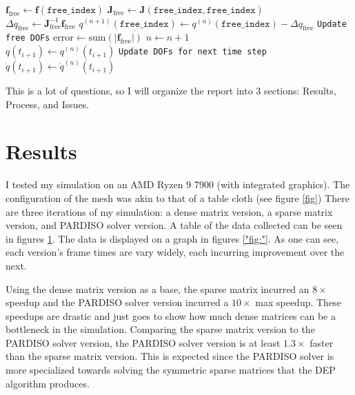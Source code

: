 \documentclass[letterpaper, 10 pt, conference]{ieeeconf}  %
\begin{document}
\begin{algorithm}[h]
\begin{algorithmic}[1]
                        \State $\mathbf{f}_\text{free} \gets \mathbf{f}(\texttt{free\_index})$
                        \State $\mathbf{J}_\text{free} \gets \mathbf{J}(\texttt{free\_index}, \texttt{free\_index})$\\
                        \State $\Delta q_\text{free} \gets \mathbf{J}_\text{free}^{-1} \mathbf{f}_\text{free}$
                        \State $q^{(n+1)}(\texttt{free\_index}) \gets q^{(n)}(\texttt{free\_index}) - \Delta q_\text{free}$ \hfill \texttt{Update free DOFs}
                        \State $\text{error} \gets \text{sum}(\lvert \mathbf{f}_\text{free} \rvert)$
                        \State $n \gets n + 1$ \\
                    \EndWhile
                    \State $q(t_{i+1}) \gets q^{(n)}(t_{i+1})$                  \hfill \texttt{Update DOFs for next time step}
                    \State $\dot{q}(t_{i+1}) \gets \dot{q}^{(n)}(t_{i+1})$
                \EndFunction
                \end{algorithmic}
                \end{algorithm}
\twocolumn


This is a lot of questions, so I will organize the report into 3 sections: Results, Process, and Issues. 

\section{Results}
I tested my simulation on an AMD Ryzen 9 7900 (with integrated graphics). The configuration of the mesh was akin to that of a table cloth (see figure \ref{fig}) There are three iterations of my simulation: a dense matrix version, a sparse matrix version, and PARDISO solver version. A table of the data collected can be seen in figures \ref{}. The data is displayed on a graph in figures \ref{"fig:"}. As one can see, each version's frame times are vary widely, each incurring improvement over the next. 

Using the dense matrix version as a base, the sparse matrix incurred an $8\times$ speedup and the PARDISO solver version incurred a $10\times$ max speedup. These speedups are drastic and just goes to show how much dense matrices can be a bottleneck in the simulation. Comparing the sparse matrix version to the PARDISO solver version, the PARDISO solver version is at least $1.3\times$ faster than the sparse matrix version. This is expected since the PARDISO solver is more specialized towards solving the symmetric sparse matrices that the DEP algorithm produces.
\end{document}

